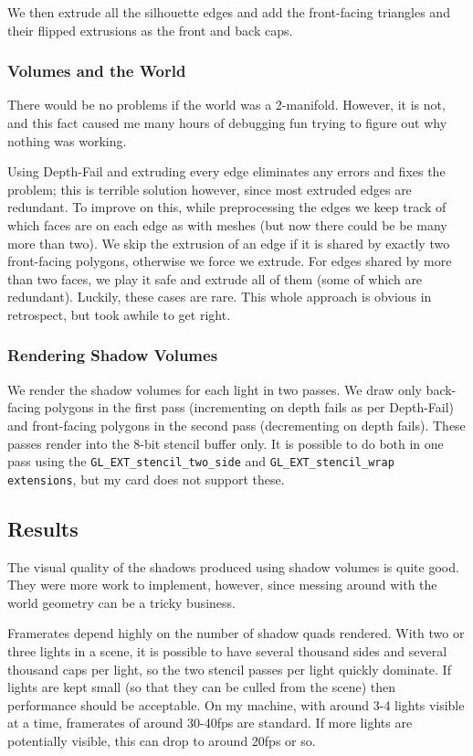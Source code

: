 \documentclass{llncs}
\begin{document}
\begin{multicols}{2}
{We then extrude all the silhouette edges and add the front-facing triangles and their
flipped extrusions as the front and back caps.  

\subsubsection{Volumes and the World} There would be no problems if the world
was a 2-manifold.  However, it is not, and this fact caused me many hours of debugging fun
trying to figure out why nothing was working.
 
Using Depth-Fail and extruding every edge eliminates any errors and fixes the
problem; this is terrible solution however, since most extruded edges are redundant.  
To improve on this, while preprocessing the edges we keep track of
which faces are on each edge as with meshes (but now there could be be many more than two).  
We skip the extrusion of an edge if it is shared by exactly two front-facing
polygons, otherwise we force we extrude.  For edges shared by more than two faces,
we play it safe and extrude all of them (some of which are redundant). Luckily,
these cases are rare.   This whole approach is obvious in retrospect, but took awhile 
to get right. 

\subsubsection{Rendering Shadow Volumes} We render the shadow volumes for each light
in two passes.  We draw only back-facing polygons in the first pass (incrementing 
on depth fails as per Depth-Fail) and front-facing polygons in the second pass 
(decrementing on depth fails).  These passes render into the 8-bit stencil buffer only.
It is possible to do both in one pass using the {\tt GL\_EXT\_stencil\_two\_side} and 
{\tt GL\_EXT\_stencil\_wrap extensions}, but my card does not support these.

\subsection{Results}  The visual quality of the shadows produced using shadow volumes
is quite good.  They were more work to implement, however, since messing around with
the world geometry can be a tricky business.  

Framerates depend highly on the number of shadow quads rendered.  With two or three
lights in a scene, it is possible to have several thousand sides and several thousand
caps per light, so the two stencil passes per light quickly dominate.  If lights are kept
small (so that they can be culled from the scene) then performance should be acceptable.
On my machine, with around 3-4 lights visible at a time, framerates of around 30-40fps
are standard.  If more lights are potentially visible, this can drop to around
20fps or so.  

}
\end{multicols}
\end{document}
